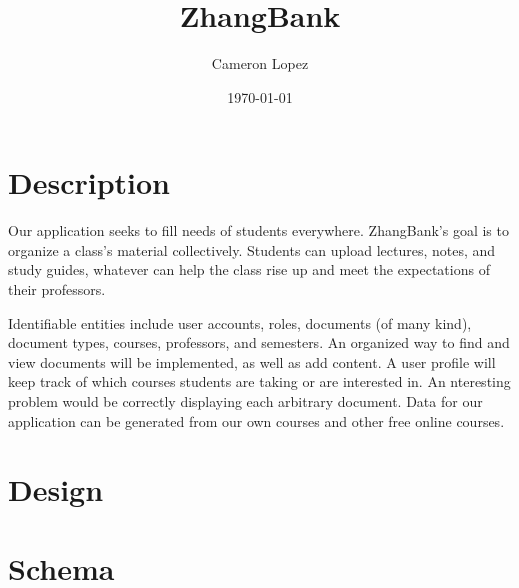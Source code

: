 \documentclass[11pt]{article}
\title{ZhangBank}
\author{Cameron Lopez}
\date{\today}
\begin{document}
\maketitle


\section*{Description}
\label{sec-1}


  Our application seeks to fill needs of students
  everywhere. ZhangBank's goal is to organize a class's material
  collectively. Students can upload lectures, notes, and study guides,
  whatever can help the class rise up and meet the expectations of
  their professors.

  Identifiable entities include user accounts, roles, documents (of
  many kind), document types, courses, professors, and semesters. An
  organized way to find and view documents will be implemented, as
  well as add content. A user profile will keep track of which courses
  students are taking or are interested in. An nteresting problem
  would be correctly displaying each arbitrary document. Data for our
  application can be generated from our own courses and other free
  online courses.
\section*{Design}
\label{sec-2}
\section*{Schema}
\label{sec-3}
\end{document}

